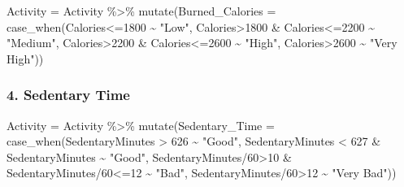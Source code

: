 \documentclass[
]{article}
\newenvironment{Shaded}{\begin{snugshade}}{\end{snugshade}}
\newcommand{\AttributeTok}[1]{\textcolor[rgb]{0.77,0.63,0.00}{#1}}
\newcommand{\DecValTok}[1]{\textcolor[rgb]{0.00,0.00,0.81}{#1}}
\newcommand{\FunctionTok}[1]{\textcolor[rgb]{0.00,0.00,0.00}{#1}}
\newcommand{\NormalTok}[1]{#1}
\newcommand{\OtherTok}[1]{\textcolor[rgb]{0.56,0.35,0.01}{#1}}
\newcommand{\SpecialCharTok}[1]{\textcolor[rgb]{0.00,0.00,0.00}{#1}}
\newcommand{\StringTok}[1]{\textcolor[rgb]{0.31,0.60,0.02}{#1}}
\begin{document}
\begin{Shaded}
\begin{Highlighting}[]
\NormalTok{Activity }\OtherTok{=}\NormalTok{ Activity }\SpecialCharTok{\%\textgreater{}\%} \FunctionTok{mutate}\NormalTok{(}\AttributeTok{Burned\_Calories =} \FunctionTok{case\_when}\NormalTok{(Calories}\SpecialCharTok{\textless{}=}\DecValTok{1800} \SpecialCharTok{\textasciitilde{}} \StringTok{"Low"}\NormalTok{, Calories}\SpecialCharTok{\textgreater{}}\DecValTok{1800} \SpecialCharTok{\&}\NormalTok{ Calories}\SpecialCharTok{\textless{}=}\DecValTok{2200} \SpecialCharTok{\textasciitilde{}} \StringTok{"Medium"}\NormalTok{,}
\NormalTok{    Calories}\SpecialCharTok{\textgreater{}}\DecValTok{2200} \SpecialCharTok{\&}\NormalTok{ Calories}\SpecialCharTok{\textless{}=}\DecValTok{2600} \SpecialCharTok{\textasciitilde{}} \StringTok{"High"}\NormalTok{, Calories}\SpecialCharTok{\textgreater{}}\DecValTok{2600} \SpecialCharTok{\textasciitilde{}} \StringTok{"Very High"}\NormalTok{))}
\end{Highlighting}
\end{Shaded}

\hypertarget{sedentary-time}{%
\subsubsection{4. Sedentary Time}\label{sedentary-time}}

\begin{Shaded}
\begin{Highlighting}[]
\NormalTok{Activity }\OtherTok{=}\NormalTok{ Activity }\SpecialCharTok{\%\textgreater{}\%} 
  \FunctionTok{mutate}\NormalTok{(}\AttributeTok{Sedentary\_Time =} \FunctionTok{case\_when}\NormalTok{(SedentaryMinutes  }\SpecialCharTok{\textgreater{}} \DecValTok{626} \SpecialCharTok{\textasciitilde{}} \StringTok{"Good"}\NormalTok{,}
\NormalTok{    SedentaryMinutes }\SpecialCharTok{\textless{}} \DecValTok{627} \SpecialCharTok{\&}\NormalTok{ SedentaryMinutes  }\SpecialCharTok{\textasciitilde{}} \StringTok{"Good"}\NormalTok{, SedentaryMinutes}\SpecialCharTok{/}\DecValTok{60}\SpecialCharTok{\textgreater{}}\DecValTok{10} \SpecialCharTok{\&}\NormalTok{ SedentaryMinutes}\SpecialCharTok{/}\DecValTok{60}\SpecialCharTok{\textless{}=}\DecValTok{12} \SpecialCharTok{\textasciitilde{}} \StringTok{"Bad"}\NormalTok{,}
\NormalTok{    SedentaryMinutes}\SpecialCharTok{/}\DecValTok{60}\SpecialCharTok{\textgreater{}}\DecValTok{12} \SpecialCharTok{\textasciitilde{}} \StringTok{"Very Bad"}\NormalTok{))}
\end{Highlighting}
\end{Shaded}
\end{document}
